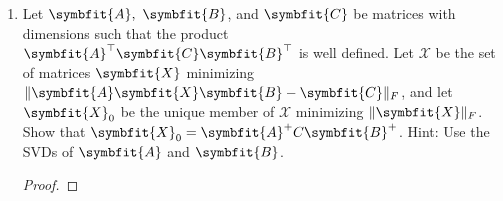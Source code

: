 \documentclass{article}
\theoremstyle{definition}
\newcommand{\mat}[1]{\symbfit{#1}}
\begin{document}
\begin{enumerate}[leftmargin=\labelsep]
\begin{proof}
		      \begin{equation}
			      \abs{\alpha_{ii}} - \sum_{\substack{j=1\\j\neq i,k}} \abs{\alpha_{ji}} > \abs{\alpha_{ki}}. \label{eq:diagdomk}
		      \end{equation}
		      We have
		      \begin{align*}
			      \abs{\beta_{ii}} & \stackrel{\mathclap{\eqref{eq:bji}}}{=} \abs{\alpha_{j+1,i+1} - \frac{\alpha_{i+1,1}\alpha_{1,i+1}}{\alpha_{11}}}                \\
			                       & \geq \abs{\alpha_{j+1,i+1}} - \abs{\frac{\alpha_{i+1,1}\alpha_{1,i+1}}{\alpha_{11}}} \qquad\text{by reverse triangle inequality} \\
			                       & \stackrel{\mathclap{\eqref{eq:diagdom}}}{>} \sum_{\substack{j=1                                                                  \\j\neq i+1}}^n \abs{\alpha_{j,i+1}} - \abs{\frac{\alpha_{i+1,1}\alpha_{1,i+1}}{\alpha_{11}}} \\
			                       & \stackrel{???}{>} \sum_{\substack{j=1                                                                                            \\j\neq i+1}}^n \abs{\alpha_{j,i+1}} - \abs{\frac{\alpha_{1,i+1}}{\alpha_{11}}}\qty( \abs{\alpha_{11}} - \sum_{\substack{j=1\\j\neq 1,i+1}}^n \abs{\alpha_{j,1}}) \\
			                       & = \sum_{\substack{j=1                                                                                                            \\j\neq i+1}}^n \abs{a_{j,i+1}}
		      \end{align*}
	      \end{proof}

	\item Let \(\mat{A},\ \mat{B}\), and \(\mat{C}\) be matrices with dimensions such that the product \(\mat{A}^\top\mat{C}\mat{B}^\top\) is well defined. Let \(\mathcal{X}\) be the set of matrices \(\mat{X}\) minimizing \(\|\mat{A}\mat{X} \mat{B} - \mat{C}\|_F\), and let \(\mat{X}_0\) be the unique member of \(\mathcal{X}\) minimizing \(\|\mat{X}\|_F\). Show that \(\mat{X}_0 = \mat{A}^+C\mat{B}^+\). Hint: Use the SVDs of \(\mat{A}\) and \(\mat{B}\).
	      \begin{proof}

	      \end{proof}


\end{enumerate}
\end{document}
